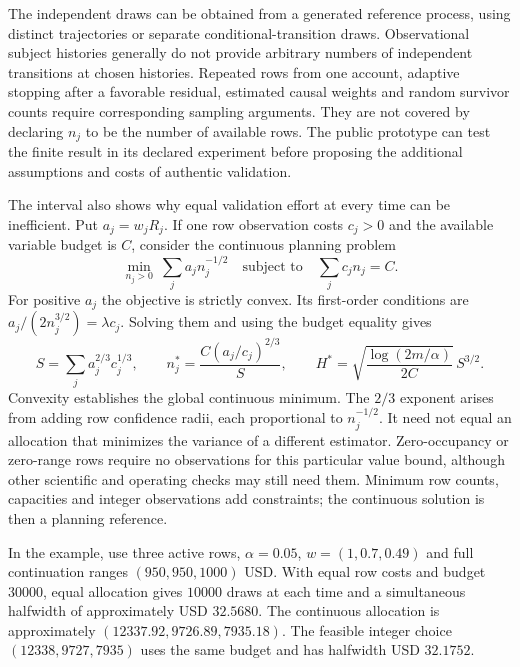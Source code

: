 The independent draws can be obtained from a generated reference process,
using distinct trajectories or separate conditional-transition draws.
Observational subject histories generally do not provide arbitrary numbers
of independent transitions at chosen histories. Repeated rows from one
account, adaptive stopping after a favorable residual, estimated causal
weights and random survivor counts require corresponding sampling arguments.
They are not covered by declaring $n_j$ to be the number of available rows.
The public prototype can test the finite result in its declared experiment
before proposing the additional assumptions and costs of authentic
validation.

The interval also shows why equal validation effort at every time can be
inefficient. Put $a_j=w_jR_j$. If one row observation costs $c_j>0$ and the
available variable budget is $C$, consider the continuous planning problem
\begin{equation}
 \min_{n_j>0}\ \sum_j a_jn_j^{-1/2}
 \quad\text{subject to}\quad \sum_jc_jn_j=C.
 \label{exec17:s5-validation-design}
\end{equation}
For positive $a_j$ the objective is strictly convex. Its first-order
conditions are $a_j/(2n_j^{3/2})=\lambda c_j$. Solving them and using the
budget equality gives
\begin{equation}
 S=\sum_j a_j^{2/3}c_j^{1/3},\qquad
 n_j^*=\frac{C(a_j/c_j)^{2/3}}S,\qquad
 H^*=\sqrt{\frac{\log(2m/\alpha)}{2C}}\,S^{3/2}.
 \label{exec17:s5-validation-allocation}
\end{equation}
Convexity establishes the global continuous minimum. The $2/3$ exponent
arises from adding row confidence radii, each proportional to $n_j^{-1/2}$.
It need not equal an allocation that minimizes the variance of a different
estimator. Zero-occupancy or zero-range rows require no observations for this
particular value bound, although other scientific and operating checks may
still need them. Minimum row counts, capacities and integer observations
add constraints; the continuous solution is then a planning reference.

In the example, use three active rows, $\alpha=0.05$,
$w=(1,0.7,0.49)$ and full continuation ranges $(950,950,1000)$ USD. With
equal row costs and budget $30000$, equal allocation gives $10000$ draws at
each time and a simultaneous halfwidth of approximately USD $32.5680$.
The continuous allocation is approximately $(12337.92,9726.89,7935.18)$.
The feasible integer choice $(12338,9727,7935)$ uses the same budget and
has halfwidth USD $32.1752$.

